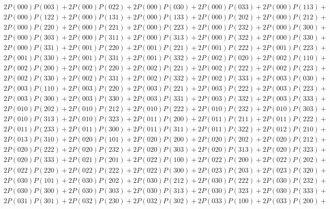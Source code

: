 \documentclass{article}
\theoremstyle{definition}
\begin{document}
    \begin{gather*}
        2P(000)P(003) + 2P(000)P(022) + 2P(000)P(030) + 2P(000)P(033) + 2P(000)P(113) +\\
        2P(000)P(122) + 2P(000)P(131) + 2P(000)P(133) + 2P(000)P(202) + 2P(000)P(212) +\\
        2P(000)P(220) + 2P(000)P(221) + 2P(000)P(223) + 2P(000)P(232) + 2P(000)P(300) +\\
        2P(000)P(303) + 2P(000)P(311) + 2P(000)P(313) + 2P(000)P(322) + 2P(000)P(330) +\\
        2P(000)P(331) + 2P(001)P(220) + 2P(001)P(221) + 2P(001)P(222) + 2P(001)P(223) +\\
        2P(001)P(330) + 2P(001)P(331) + 2P(001)P(332) + 2P(002)P(020) + 2P(002)P(110) +\\
        2P(002)P(200) + 2P(002)P(220) + 2P(002)P(221) + 2P(002)P(222) + 2P(002)P(223) +\\
        2P(002)P(330) + 2P(002)P(331) + 2P(002)P(332) + 2P(002)P(333) + 2P(003)P(030) +\\
        2P(003)P(110) + 2P(003)P(220) + 2P(003)P(221) + 2P(003)P(222) + 2P(003)P(223) +\\
        2P(003)P(300) + 2P(003)P(330) + 2P(003)P(331) + 2P(003)P(332) + 2P(003)P(333) +\\
        2P(010)P(202) + 2P(010)P(212) + 2P(010)P(222) + 2P(010)P(232) + 2P(010)P(303) +\\
        2P(010)P(313) + 2P(010)P(323) + 2P(011)P(200) + 2P(011)P(211) + 2P(011)P(222) +\\
        2P(011)P(233) + 2P(011)P(300) + 2P(011)P(311) + 2P(011)P(322) + 2P(012)P(210) +\\
        2P(013)P(310) + 2P(020)P(101) + 2P(020)P(200) + 2P(020)P(202) + 2P(020)P(212) +\\
        2P(020)P(222) + 2P(020)P(232) + 2P(020)P(303) + 2P(020)P(313) + 2P(020)P(323) +\\
        2P(020)P(333) + 2P(021)P(201) + 2P(022)P(100) + 2P(022)P(200) + 2P(022)P(202) +\\
        2P(022)P(220) + 2P(022)P(222) + 2P(022)P(300) + 2P(023)P(203) + 2P(023)P(320) +\\
        2P(030)P(101) + 2P(030)P(202) + 2P(030)P(212) + 2P(030)P(222) + 2P(030)P(232) +\\
        2P(030)P(300) + 2P(030)P(303) + 2P(030)P(313) + 2P(030)P(323) + 2P(030)P(333) +\\
        2P(031)P(301) + 2P(032)P(230) + 2P(032)P(302) + 2P(033)P(100) + 2P(033)P(200) +\\

\end{gather*}
\end{document}
